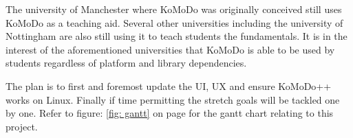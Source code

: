 The university of Manchester where KoMoDo was originally conceived still uses KoMoDo as a teaching aid. Several other universities including the university of Nottingham are also still using it to teach students the fundamentals. It is in the interest of the aforementioned universities that KoMoDo is able to be used by students regardless of platform and library dependencies.

The plan is to first and foremost update the UI, UX and ensure KoMoDo++ works on Linux. Finally if time permitting the stretch goals will be tackled one by one. Refer to figure: \ref{fig: gantt} on page \pageref{fig: gantt} for the gantt chart relating to this project.
